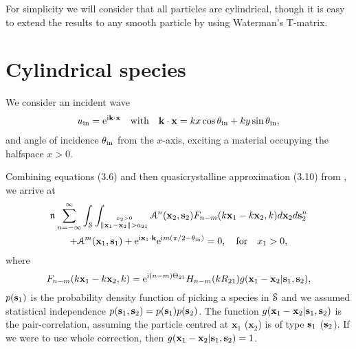 \documentclass[12pt, a4paper]{article}
\begin{document}
For simplicity we will consider that all particles are cylindrical, though it is easy to extend the results to any smooth particle by using Waterman's T-matrix\cite{waterman_symmetry_1971,varadan_multiple_1978,mishchenko_t-matrix_1996}.



\section{Cylindrical species}

We consider an incident wave
\begin{gather}
  u_{\mathrm{in}} =  \textrm{e}^{\textrm{i} \mathbf k \cdot \mathbf x} \quad \text{with} \quad \mathbf k \cdot \mathbf x = k x \cos \theta_{\mathrm{in}}  + k y \sin \theta_{\mathrm{in}},
  \label{eqns:incident}
\end{gather}
and angle of incidence $\theta_{\mathrm{in}}$ from the $x$-axis, exciting a material occupying the halfspace $x>0$.

Combining equations (3.6) and then quasicrystalline approximation (3.10) from \parencite{gower_reflection_2018}, we arrive at
\begin{multline}
\mathfrak n_{} \sum_{n=-\infty}^\infty \int_\mathcal S \int_{\stackrel{x_2 > 0 }{\|\mathbf x_1 - \mathbf x_2 \| > a_{21}}}  \mathcal A^n (\mathbf x_2, \mathbf s_2) F_{n-m}(k\mathbf x_1 - k \mathbf x_2,k)  d \mathbf x_2 d\mathbf s_2^n
\\
+  \mathcal A^m (\mathbf x_1, \mathbf s_1) + \textrm{e}^{\textrm{i} \mathbf x_1 \cdot \mathbf k } \textrm{e}^{\textrm{i} m ( \pi/2 - \theta_{\mathrm{in}} )}
   = 0, \quad \text{for} \quad x_1 >0,
  \label{eqn:ensemAsystem}
\end{multline}
where
\begin{equation}
  F_{n-m}(k\mathbf x_1 - k \mathbf x_2,k) = \textrm{e}^{\textrm{i} (n-m) \Theta_{21}} H_{n-m}(k R_{21})g(\mathbf x_1 - \mathbf x_2| \mathbf s_1,\mathbf s_2),
  \label{eqn:integral_kernel}
\end{equation}
$p(\mathbf s_1)$ is the probability density function of picking a species in $\mathcal S$ and we assumed statistical independence $p(\mathbf s_1, \mathbf s_2) = p(\mathbf s_1)p(\mathbf s_2)$. The function $g(\mathbf x_1 - \mathbf x_2| \mathbf s_1,\mathbf s_2)$ is the pair-correlation, assuming the particle centred at $\mathbf x_1$ ($\mathbf x_2$) is of type $\mathbf s_1$ ($\mathbf s_2$). If we were to use whole correction, then $g(\mathbf x_1 - \mathbf x_2| \mathbf s_1,\mathbf s_2) = 1$.
\end{document}
